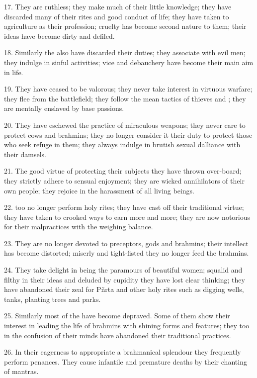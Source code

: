 17. They are ruthless; they make much of their little knowledge; they have
discarded many of their rites and good conduct of life; they have taken to
agriculture as their profession; cruelty has become second nature to them; their
ideas have become dirty and defiled.

18. Similarly the  also have discarded their duties; they
associate with evil men; they indulge in sinful activities; vice and debauchery
have become their main aim in life.

19. They have ceased to be valorous; they never take interest in virtuous
warfare; they flee from the battlefield; they follow the mean tactics of thieves
and ; they are mentally enslaved by base passions.

20. They have eschewed the practice of miraculous weapons; they never care to
protect cows and brahmins; they no longer consider it their duty to protect
those who seek refuge in them; they always indulge in brutish sexual dalliance
with their damsels.

21. The good virtue of protecting their subjects they have thrown over-board;
they strictly adhere to sensual enjoyment; they are wicked annihilators of their
own people; they rejoice in the harassment of all living beings.

22.  too no longer perform holy rites; they have cast off their
traditional virtue; they have taken to crooked ways to earn more and more; they
are now notorious for their malpractices with the weighing balance.

23. They are no longer devoted to preceptors, gods and brahmins; their intellect
has become distorted; miserly and tight-fisted they no longer feed the brahmins.

24. They take delight in being the paramours of beautiful women; squalid and
filthy in their ideas and deluded by cupidity they have lost clear thinking;
they have abandoned their zeal for Pñrta and other holy rites such as digging
wells, tanks, planting trees and parks.

25. Similarly most of the  have become depraved. Some of them show
their interest in leading the life of brahmins with shining forms and features;
they too in the confusion of their minds have abandoned their traditional
practices.

26. In their eagerness to appropriate a brahmanical splendour they frequently
perform penances. They cause infantile and premature deaths by their chanting
of mantras.

